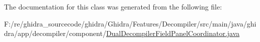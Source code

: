 The documentation for this class was generated from the following file\+:\begin{DoxyCompactItemize}
\item 
F\+:/re/ghidra\+\_\+sourcecode/ghidra/\+Ghidra/\+Features/\+Decompiler/src/main/java/ghidra/app/decompiler/component/\mbox{\hyperlink{_dual_decompiler_field_panel_coordinator_8java}{Dual\+Decompiler\+Field\+Panel\+Coordinator.\+java}}\end{DoxyCompactItemize}
